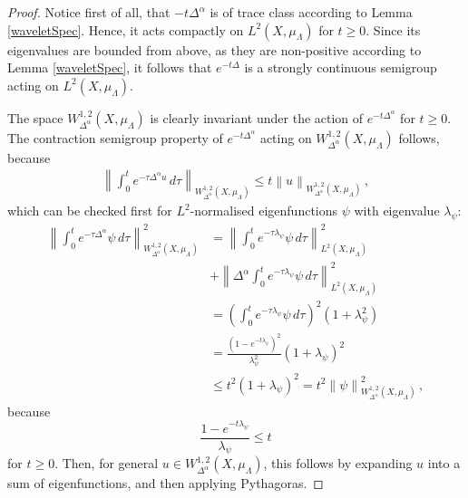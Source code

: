 \documentclass[a4paper,draft]{ZbRad}
\theoremstyle{plain}
\theoremstyle{definition}
\numberwithin{equation}{section}
\renewcommand{\le}{\leqslant}\renewcommand{\leq}{\leqslant}
\renewcommand{\ge}{\geqslant}\renewcommand{\geq}{\geqslant}
\newcommand{\norm}[1]{\left\|#1\right\|}
\begin{document}
\begin{proof}
Notice first of all, that $-t\Delta^\alpha$ is of trace class according to Lemma \ref{waveletSpec}. Hence, it acts compactly on $L^2(X,\mu_\Lambda)$ for $t\ge0$.
Since  its
eigenvalues are bounded from above, as they are non-positive according to
Lemma \ref{waveletSpec},
it follows that $e^{-t\Delta}$ is a strongly continuous semigroup acting on 
$L^2(X,\mu_\Lambda)$.

\smallskip
The space $W^{1,2}_{\Delta^\alpha}(X,\mu_\Lambda)$ is clearly invariant under the action of $e^{-t\Delta^\alpha}$ for
$t \ge 0$. The contraction semigroup property of $e^{-t\Delta^\alpha}$ acting on $W_{\Delta^\alpha}^{1,2}(X,\mu_\Lambda)$
follows, because
\begin{align}\label{importantIneq}
\norm{\int_0^t e^{-\tau\Delta^\alpha u}\,d\tau}_{W_{\Delta^\alpha}^{1,2}(X,\mu_\Lambda)}\le t\norm{u}_{W_{\Delta^\alpha}^{1,2}(X,\mu_\Lambda)}\,,
\end{align}
which can be checked first for $L^2$-normalised eigenfunctions $\psi$ with eigenvalue $\lambda_\psi$:
\begin{align*}
\norm{\int_0^t e^{-\tau\Delta^\alpha}\psi\,d\tau}^2_{W^{1,2}_{\Delta^\alpha}(X,\mu_\Lambda)}&
=\norm{\int_0^te^{-\tau\lambda_\psi}\psi\,d\tau}^2_{L^2(X,\mu_\Lambda)}
\\
&+\norm{\Delta^\alpha\int_0^t e^{-\tau\lambda_\psi}\psi\,d\tau}^2_{L^2(X,\mu_\Lambda)}
\\
&=\left(\int_0^t e^{-\tau\lambda_\psi}\psi\,d\tau\right)^2
(1+\lambda_\psi^2)
\\
&=\frac{(1-e^{-t\lambda_\psi})^2}{\lambda_\psi^2}(1+\lambda_\psi)^2
\\
&\le t^2(1+\lambda_\psi)^2
=t^2\norm{\psi}^2_{W_{\Delta^\alpha}^{1,2}(X,\mu_\Lambda)}\,,
\end{align*}
because
\[
\frac{1-e^{-t\lambda_\psi}}{\lambda_\psi}\le t
\]
for $t\ge 0$. Then, for general 
$u \in W_{\Delta^\alpha}^{1,2}(X,\mu_\Lambda)$, 
this follows by expanding $u$ into
a sum of eigenfunctions, and then applying Pythagoras.


\end{proof}
\end{document}
